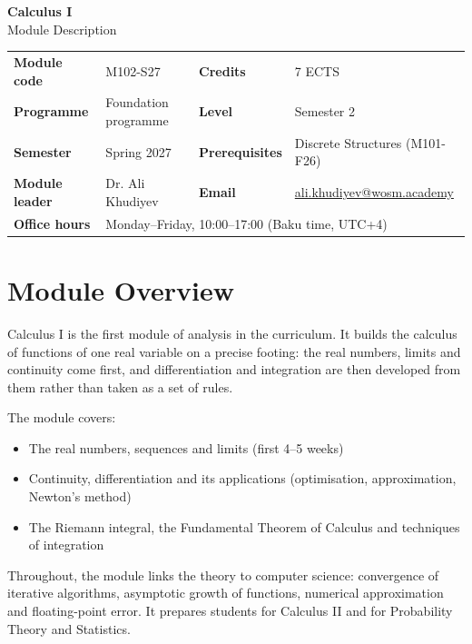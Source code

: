 \documentclass[11pt,a4paper]{article}
\makeatletter
\newcommand{\ModuleTitle}{Calculus I}
\newcommand{\ModuleCode}{M102-S27}
\newcommand{\Programme}{Foundation programme}
\newcommand{\Level}{Semester 2}
\newcommand{\Semester}{Spring 2027}
\newcommand{\Credits}{7 ECTS}
\newcommand{\ModuleLeader}{Dr. Ali Khudiyev}
\newcommand{\Email}{ali.khudiyev@wosm.academy}
\newcommand{\OfficeHours}{Monday--Friday, 10:00--17:00 (Baku time, UTC+4)}
\newcommand{\Prerequisites}{Discrete Structures (M101-F26)}
\makeatother
\begin{document}
\begin{center}
  {\LARGE\bfseries\color{accent} \ModuleTitle}\\[4pt]
  {\large Module Description}
\end{center}
\vspace{6pt}

\begin{tabularx}{\textwidth}{>{\bfseries}l X >{\bfseries}l X}
\toprule
Module code   & \ModuleCode    & Credits      & \Credits \\
Programme     & \Programme     & Level        & \Level \\
Semester      & \Semester      & Prerequisites & \Prerequisites \\
Module leader & \ModuleLeader  & Email        & \href{mailto:\Email}{\Email} \\
Office hours  & \multicolumn{3}{l}{\OfficeHours} \\
\bottomrule
\end{tabularx}

\section{Module Overview}
Calculus I is the first module of analysis in the curriculum. It builds the
calculus of functions of one real variable on a precise footing: the real numbers,
limits and continuity come first, and differentiation and integration are then
developed from them rather than taken as a set of rules.

The module covers:
\begin{itemize}
  \item The real numbers, sequences and limits (first 4--5 weeks)
  \item Continuity, differentiation and its applications (optimisation, approximation,
        Newton's method)
  \item The Riemann integral, the Fundamental Theorem of Calculus and techniques of
        integration
\end{itemize}

Throughout, the module links the theory to computer science: convergence of
iterative algorithms, asymptotic growth of functions, numerical approximation and
floating-point error. It prepares students for Calculus II and for Probability
Theory and Statistics.
\end{document}
